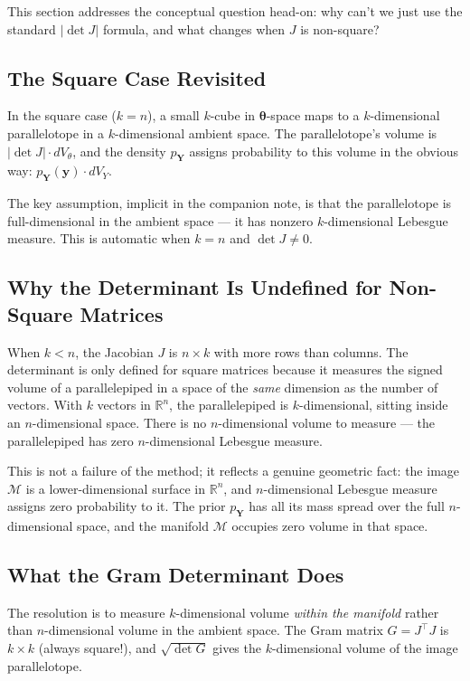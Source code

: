 \documentclass[11pt,a4paper]{article}
\theoremstyle{definition}
\newcommand{\btheta}{\boldsymbol{\theta}}
\begin{document}
This section addresses the conceptual question head-on: why can't we just use
the standard $|\!\det J|$ formula, and what changes when $J$ is non-square?

\subsection{The Square Case Revisited}

In the square case ($k = n$), a small $k$-cube in $\btheta$-space maps to a
$k$-dimensional parallelotope in a $k$-dimensional ambient space. The
parallelotope's volume is $|\!\det J| \cdot dV_\theta$, and the density
$p_{\mathbf{Y}}$ assigns probability to this volume in the obvious way:
$p_{\mathbf{Y}}(\mathbf{y}) \cdot dV_Y$.

The key assumption, implicit in the companion note, is that the parallelotope
is full-dimensional in the ambient space --- it has nonzero $k$-dimensional
Lebesgue measure. This is automatic when $k = n$ and $\det J \neq 0$.

\subsection{Why the Determinant Is Undefined for Non-Square Matrices}

When $k < n$, the Jacobian $J$ is $n \times k$ with more rows than columns.
The determinant is only defined for square matrices because it measures the
signed volume of a parallelepiped in a space of the \emph{same} dimension as
the number of vectors. With $k$ vectors in $\mathbb{R}^n$, the parallelepiped
is $k$-dimensional, sitting inside an $n$-dimensional space. There is no
$n$-dimensional volume to measure --- the parallelepiped has zero
$n$-dimensional Lebesgue measure.

This is not a failure of the method; it reflects a genuine geometric fact: the
image $\mathcal{M}$ is a lower-dimensional surface in $\mathbb{R}^n$, and
$n$-dimensional Lebesgue measure assigns zero probability to it. The prior
$p_{\mathbf{Y}}$ has all its mass spread over the full $n$-dimensional space,
and the manifold $\mathcal{M}$ occupies zero volume in that space.

\subsection{What the Gram Determinant Does}

The resolution is to measure $k$-dimensional volume \emph{within the manifold}
rather than $n$-dimensional volume in the ambient space. The Gram matrix
$G = J^\top J$ is $k \times k$ (always square!), and $\sqrt{\det G}$ gives the
$k$-dimensional volume of the image parallelotope.
\end{document}
